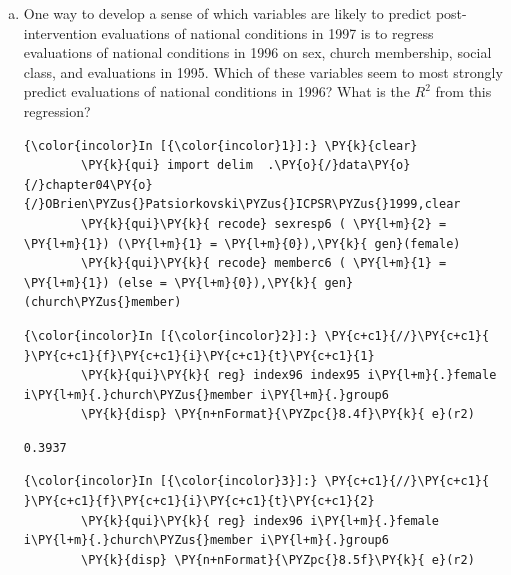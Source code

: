 \documentclass[11pt,notitlepage]{article}\usepackage[]{graphicx}\usepackage[]{color}
\makeatletter
\newenvironment{kframe}{%
 \def\at@end@of@kframe{}%
 \ifinner\ifhmode%
  \def\at@end@of@kframe{\end{minipage}}%
  \begin{minipage}{\columnwidth}%
 \fi\fi%
 \def\FrameCommand##1{\hskip\@totalleftmargin \hskip-\fboxsep
 \colorbox{shadecolor}{##1}\hskip-\fboxsep
     \hskip-\linewidth \hskip-\@totalleftmargin \hskip\columnwidth}%
 \MakeFramed {\advance\hsize-\width
   \@totalleftmargin\z@ \linewidth\hsize
   \@setminipage}}%
 {\par\unskip\endMakeFramed%
 \at@end@of@kframe}
\newenvironment{knitrout}{}{} %
\makeatother
\begin{document}
\begin{enumerate}[a)]
\item One way to develop a sense of which variables are likely to predict post-intervention evaluations of national conditions in 1997 is to regress evaluations of national conditions in 1996 on sex, church membership, social class, and evaluations in 1995. Which of these variables seem to most strongly predict evaluations of national conditions in 1996?  What is the $R^2$ from this regression? 

\begin{knitrout}
\color{fgcolor}\begin{kframe}
   \begin{Verbatim}[commandchars=\\\{\}]
{\color{incolor}In [{\color{incolor}1}]:} \PY{k}{clear}
        \PY{k}{qui} import delim  .\PY{o}{/}data\PY{o}{/}chapter04\PY{o}{/}OBrien\PYZus{}Patsiorkovski\PYZus{}ICPSR\PYZus{}1999,clear     
        \PY{k}{qui}\PY{k}{ recode} sexresp6 ( \PY{l+m}{2} = \PY{l+m}{1}) (\PY{l+m}{1} = \PY{l+m}{0}),\PY{k}{ gen}(female)
        \PY{k}{qui}\PY{k}{ recode} memberc6 ( \PY{l+m}{1} = \PY{l+m}{1}) (else = \PY{l+m}{0}),\PY{k}{ gen}(church\PYZus{}member)
\end{Verbatim}

    \begin{Verbatim}[commandchars=\\\{\}]
{\color{incolor}In [{\color{incolor}2}]:} \PY{c+c1}{//}\PY{c+c1}{ }\PY{c+c1}{f}\PY{c+c1}{i}\PY{c+c1}{t}\PY{c+c1}{1}
        \PY{k}{qui}\PY{k}{ reg} index96 index95 i\PY{l+m}{.}female i\PY{l+m}{.}church\PYZus{}member i\PY{l+m}{.}group6
        \PY{k}{disp} \PY{n+nFormat}{\PYZpc{}8.4f}\PY{k}{ e}(r2)
\end{Verbatim}

    \begin{Verbatim}[commandchars=\\\{\}]
  0.3937
    \end{Verbatim}

    \begin{Verbatim}[commandchars=\\\{\}]
{\color{incolor}In [{\color{incolor}3}]:} \PY{c+c1}{//}\PY{c+c1}{ }\PY{c+c1}{f}\PY{c+c1}{i}\PY{c+c1}{t}\PY{c+c1}{2}
        \PY{k}{qui}\PY{k}{ reg} index96 i\PY{l+m}{.}female i\PY{l+m}{.}church\PYZus{}member i\PY{l+m}{.}group6
        \PY{k}{disp} \PY{n+nFormat}{\PYZpc{}8.5f}\PY{k}{ e}(r2)
\end{Verbatim}


\end{kframe}
\end{knitrout}
\end{enumerate}
\end{document}
